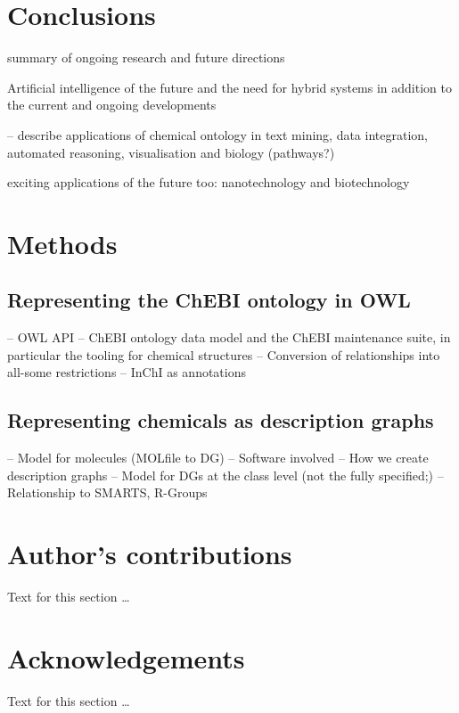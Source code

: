 \documentclass[10pt]{bmc_article}
\newenvironment{bmcformat}{\baselineskip20pt\sloppy\setboolean{publ}{false}}{\baselineskip20pt\sloppy}
\begin{document}
\begin{bmcformat}
\section*{Conclusions}

summary of ongoing research and future directions

Artificial intelligence of the future and the need for hybrid systems in addition to the current and ongoing developments 


-- describe applications of chemical ontology in text mining, data integration, automated reasoning, visualisation and biology (pathways?)

exciting applications of the future too: nanotechnology and biotechnology 



\section*{Methods}

\subsection*{Representing the ChEBI ontology in OWL}

-- OWL API
-- ChEBI ontology data model and the ChEBI maintenance suite, in particular the tooling for chemical structures
-- Conversion of relationships into all-some restrictions
-- InChI as annotations

\subsection*{Representing chemicals as description graphs}
-- Model for molecules (MOLfile to DG)
-- Software involved
-- How we create description graphs
-- Model for DGs at the class level (not the fully specified;)
-- Relationship to SMARTS, R-Groups

\bigskip


\section*{Author's contributions}
    Text for this section \ldots

    

\section*{Acknowledgements}
  Text for this section \ldots
 

\end{bmcformat}
\end{document}
